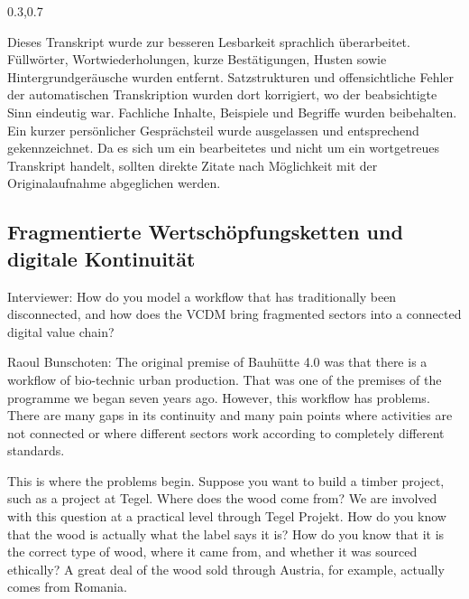 \label{anlage:transkript-bunschoten}

\begin{Table}[title=Interviewinformationen]
\begin{SemioTable}{0.3,0.7}
\end{SemioTable}
\end{Table}

Dieses Transkript wurde zur besseren Lesbarkeit sprachlich überarbeitet. Füllwörter, Wortwiederholungen, kurze Bestätigungen, Husten sowie Hintergrundgeräusche wurden entfernt. Satzstrukturen und offensichtliche Fehler der automatischen Transkription wurden dort korrigiert, wo der beabsichtigte Sinn eindeutig war. Fachliche Inhalte, Beispiele und Begriffe wurden beibehalten. Ein kurzer persönlicher Gesprächsteil wurde ausgelassen und entsprechend gekennzeichnet. Da es sich um ein bearbeitetes und nicht um ein wortgetreues Transkript handelt, sollten direkte Zitate nach Möglichkeit mit der Originalaufnahme abgeglichen werden.

\subsection{Fragmentierte Wertschöpfungsketten und digitale Kontinuität}

Interviewer: How do you model a workflow that has traditionally been disconnected, and how does the VCDM bring fragmented sectors into a connected digital value chain?

Raoul Bunschoten: The original premise of Bauhütte 4.0 was that there is a workflow of bio-technic urban production. That was one of the premises of the programme we began seven years ago. However, this workflow has problems. There are many gaps in its continuity and many pain points where activities are not connected or where different sectors work according to completely different standards.

This is where the problems begin. Suppose you want to build a timber project, such as a project at Tegel. Where does the wood come from? We are involved with this question at a practical level through Tegel Projekt. How do you know that the wood is actually what the label says it is? How do you know that it is the correct type of wood, where it came from, and whether it was sourced ethically? A great deal of the wood sold through Austria, for example, actually comes from Romania.


